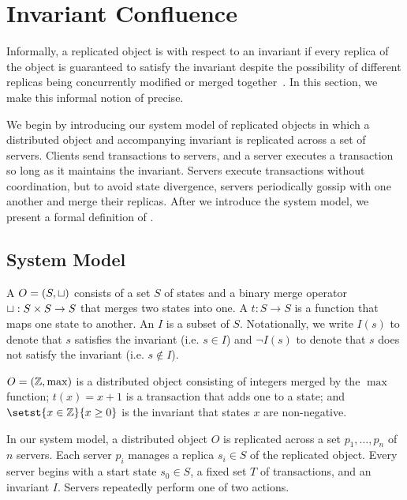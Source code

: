 \section{Invariant Confluence}
Informally, a replicated object is  with respect
to an invariant if every replica of the object is guaranteed to satisfy the
invariant despite the possibility of different replicas being concurrently
modified or merged together~\cite{bailis2014coordination}. In this section, we
make this informal notion of \invariantconfluence{} precise.

We begin by introducing our system model of replicated objects in which a
distributed object and accompanying invariant is replicated across a set of
servers. Clients send transactions to servers, and a server executes a
transaction so long as it maintains the invariant. Servers execute
transactions without coordination, but to avoid state divergence, servers
periodically gossip with one another and merge their replicas.
%
After we introduce the system model, we present a formal definition of
\invariantconfluence{}.

\subsection{System Model}

A  $O = (S, \sqcup)$ consists of a set $S$ of states
and a binary merge operator $\sqcup: S \times S \to S$ that merges two states
into one. A  $t: S \to S$ is a function that maps one
state to another. An  $I$ is a subset of $S$. Notationally,
we write $I(s)$ to denote that $s$ satisfies the invariant (i.e. $s \in I$)
and $\lnot I(s)$ to denote that $s$ does not satisfy the invariant (i.e. $s
\notin I$).

\begin{example}
  $O = (\mathbb{Z}, \max)$ is a distributed object consisting of integers merged by the
  $\max$ function; $t(x) = x + 1$ is a transaction that adds one to a state; and
  $\setst{x \in \ints}{x \geq 0}$ is the invariant that states $x$ are
  non-negative.
\end{example}

In our system model, a distributed object $O$ is replicated across a set $p_1,
\ldots, p_n$ of $n$ servers. Each server $p_i$ manages a replica $s_i \in S$ of
the replicated object. Every server begins with a start state $s_0 \in S$, a
fixed set $T$ of transactions, and an invariant $I$. Servers repeatedly perform
one of two actions.

